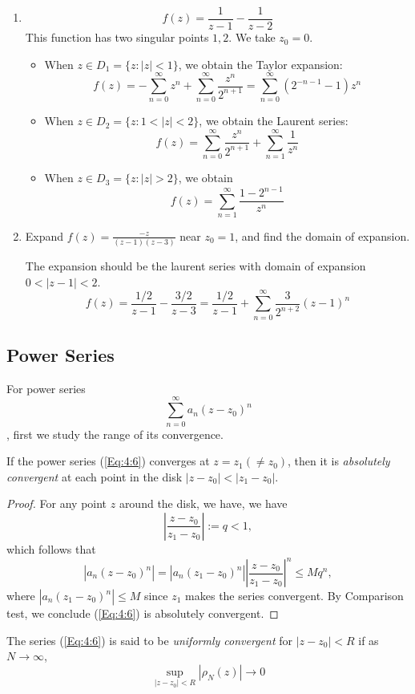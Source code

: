 \begin{example}
\begin{enumerate}
\item
\[
f(z)=\frac{1}{z-1} - \frac{1}{z-2}
\]
This function has two singular points $1,2$. We take $z_0=0$.
\begin{itemize}
\item
When $z\in D_1=\{z:|z|<1\}$, we obtain the Taylor expansion:
\[
f(z)=-\sum_{n=0}^\infty z^n+\sum_{n=0}^\infty\frac{z^n}{2^{n+1}}=\sum_{n=0}^\infty(2^{-n-1}-1)z^n
\]
\item
When $z\in D_2=\{z:1<|z|<2\}$, we obtain the Laurent series:
\[
f(z)=\sum_{n=0}^\infty\frac{z^n}{2^{n+1}}+\sum_{n=1}^\infty\frac{1}{z^n}
\]
\item
When $z\in D_3=\{z:|z|>2\}$, we obtain
\[
f(z)=\sum_{n=1}^\infty\frac{1-2^{n-1}}{z^n}
\]
\end{itemize}
\item
Expand $f(z)=\frac{-z}{(z-1)(z-3)}$ near $z_0=1$, and find the domain of expansion.

The expansion should be the laurent series with domain of expansion $0<|z-1|<2$.
\[
f(z)=\frac{1/2}{z-1}-\frac{3/2}{z-3}=\frac{1/2}{z-1}+\sum_{n=0}^\infty\frac{3}{2^{n+2}}(z-1)^n
\]





\end{enumerate}
\end{example}
\subsection{Power Series}
For power series
\begin{equation}\label{Eq:4:6}
\sum_{n=0}^\infty a_n(z-z_0)^n
\end{equation}
, first we study the range of its convergence.
\begin{theorem}\label{The:4:3}
If the power series (\ref{Eq:4:6}) converges at $z=z_1(\ne z_0)$, then it is \emph{absolutely convergent} at each point in the disk $|z-z_0|<|z_1-z_0|$.
\end{theorem}
\begin{proof}
For any point $z$ around the disk, we have, we have
\[
\left|\frac{z-z_0}{z_1-z_0}\right|:=q<1,
\]
which follows that
\[
|a_n(z-z_0)^n|=|a_n(z_1-z_0)^n|\left|\frac{z-z_0}{z_1-z_0}\right|^n\le Mq^n,
\]
where $|a_n(z_1-z_0)^n|\le M$ since $z_1$ makes the series convergent. By Comparison test, we conclude (\ref{Eq:4:6}) is absolutely convergent.
\end{proof}
\begin{definition}
The series (\ref{Eq:4:6}) is said to be \emph{uniformly convergent} for $|z-z_0|<R$ if as $N\to\infty$,
\[
\sup_{|z-z_0|<R}|\rho_N(z)|\to0
\]
\end{definition}

